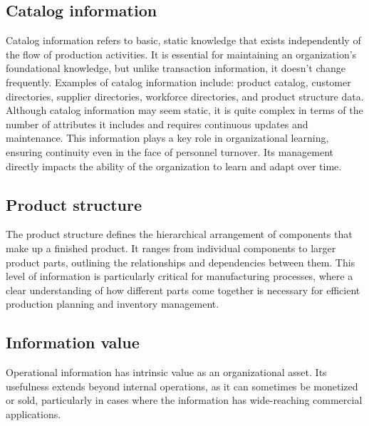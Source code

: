 \subsection{Catalog information}
Catalog information refers to basic, static knowledge that exists independently of the flow of production activities. It is essential for maintaining an organization's foundational knowledge, but unlike transaction information, it doesn't change frequently. 
Examples of catalog information include: product catalog, customer directories, supplier directories, workforce directories, and product structure data.
Although catalog information may seem static, it is quite complex in terms of the number of attributes it includes and requires continuous updates and maintenance. 
This information plays a key role in organizational learning, ensuring continuity even in the face of personnel turnover. Its management directly impacts the ability of the organization to learn and adapt over time.

\subsection{Product structure}
The product structure defines the hierarchical arrangement of components that make up a finished product. 
It ranges from individual components to larger product parts, outlining the relationships and dependencies between them.
This level of information is particularly critical for manufacturing processes, where a clear understanding of how different parts come together is necessary for efficient production planning and inventory management.

\subsection{Information value}
Operational information has intrinsic value as an organizational asset.
Its usefulness extends beyond internal operations, as it can sometimes be monetized or sold, particularly in cases where the information has wide-reaching commercial applications. 
